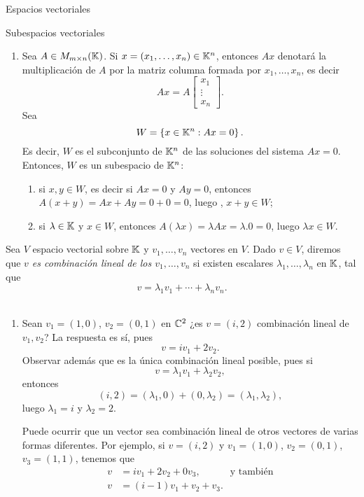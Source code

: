 \begin{chapter}{Espacios vectoriales}
\begin{section}{Subespacios vectoriales}
\begin{ejemplo*}
\begin{enumerate}
        \item Sea $A \in M_{m \times n}(\mathbb K)$. Si $x = (x_1,\ldots,x_n) \in \mathbb K^n$,  entonces $Ax$ denotará la multiplicación de $A$ por la matriz columna formada por $x_1,\ldots,x_n$,  es decir
        $$
        Ax = A\begin{bmatrix} x_1 \\ \vdots \\ x_n\end{bmatrix}.
        $$
        Sea 
        $$
        W = \left\{x \in \mathbb K^n: Ax=0 \right\}.
        $$
        Es decir, $W$  es el subconjunto de $\mathbb K^n$ de las soluciones del sistema $Ax=0$. Entonces, $W$  es un subespacio de $\mathbb K^n$:
        \begin{enumerate}
            \item si $x,y \in W$, es decir si $Ax=0$ y $Ay=0$,  entonces $A(x+y) = Ax + Ay = 0 + 0 = 0$, luego , $x+y \in W$;
            \item si $\lambda \in \mathbb K$ y $x \in W$, entonces $A(\lambda x) = \lambda Ax =\lambda.0 =0$, luego $\lambda x \in W$. 
        \end{enumerate}
    \end{enumerate}
\end{ejemplo*}

\begin{definicion}
    Sea $V$ espacio vectorial sobre $\mathbb K$ y $v_1,\ldots,v_n$ vectores en $V$. Dado $v \in V$, diremos que\textit{ $v$  es combinación lineal de los $v_1,\ldots,v_n$ } si existen escalares $\lambda_1,\ldots,\lambda_n$ en $\mathbb K$,  tal que 
    $$
    v = \lambda_1v_1+\cdots+\lambda_nv_n.
    $$
\end{definicion}

\begin{ejemplo*} ${}^{}$
\begin{enumerate}
    \item Sean $v_1 = (1,0)$, $v_2 = (0,1)$ en $\mathbb C^2$ ¿es $v = (i,2)$ combinación lineal de $v_1,v_2$? La respuesta es sí, pues 
    $$
    v = iv_1+2v_2.
    $$
    Observar además que es la única combinación lineal posible, pues si 
    $$
    v = \lambda_1v_1+ \lambda_2 v_2,
    $$
    entonces
    $$
    (i,2) = (\lambda_1,0)+(0,\lambda_2) = (\lambda_1,\lambda_2),
    $$
    luego $\lambda_1=i$ y $\lambda_2= 2$.
    
    Puede ocurrir que un vector sea combinación lineal de otros vectores de varias formas diferentes. Por ejemplo,   si   $v = (i,2)$ y $v_1 = (1,0)$, $v_2 = (0,1)$, $v_3 = (1,1)$,  tenemos que
    \begin{align*}
        v &= iv_1+2v_2+0v_3,\quad\quad\quad\text{y también}\\
        v &= (i-1)v_1 + v_2 + v_3.  
    \end{align*}
    

\end{enumerate}
\end{ejemplo*}
\end{section}
\end{chapter}
